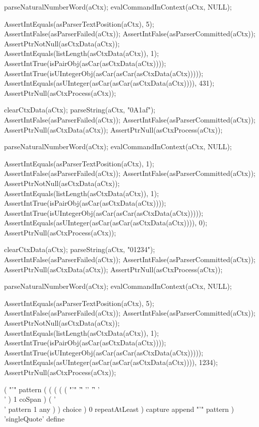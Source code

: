   parseNaturalNumberWord(aCtx);
  evalCommandInContext(aCtx, NULL);
  
  AssertIntEquals(asParserTextPosition(aCtx), 5);
  AssertIntFalse(asParserFailed(aCtx));
  AssertIntFalse(asParserCommitted(aCtx));
  AssertPtrNotNull(asCtxData(aCtx));
  AssertIntEquals(listLength(asCtxData(aCtx)), 1);
  AssertIntTrue(isPairObj(asCar(asCtxData(aCtx))));
  AssertIntTrue(isUIntegerObj(asCar(asCar(asCtxData(aCtx)))));
  AssertIntEquals(asUInteger(asCar(asCar(asCtxData(aCtx)))), 431);  
  AssertPtrNull(asCtxProcess(aCtx));
  
  clearCtxData(aCtx);
  parseString(aCtx, "0A1af");
  AssertIntFalse(asParserFailed(aCtx));
  AssertIntFalse(asParserCommitted(aCtx));
  AssertPtrNull(asCtxData(aCtx));
  AssertPtrNull(asCtxProcess(aCtx));
  
  parseNaturalNumberWord(aCtx);
  evalCommandInContext(aCtx, NULL);
  
  AssertIntEquals(asParserTextPosition(aCtx), 1);
  AssertIntFalse(asParserFailed(aCtx));
  AssertIntFalse(asParserCommitted(aCtx));
  AssertPtrNotNull(asCtxData(aCtx));
  AssertIntEquals(listLength(asCtxData(aCtx)), 1);
  AssertIntTrue(isPairObj(asCar(asCtxData(aCtx))));
  AssertIntTrue(isUIntegerObj(asCar(asCar(asCtxData(aCtx)))));
  AssertIntEquals(asUInteger(asCar(asCar(asCtxData(aCtx)))), 0);
  AssertPtrNull(asCtxProcess(aCtx));
  
  clearCtxData(aCtx);
  parseString(aCtx, "01234");
  AssertIntFalse(asParserFailed(aCtx));
  AssertIntFalse(asParserCommitted(aCtx));
  AssertPtrNull(asCtxData(aCtx));
  AssertPtrNull(asCtxProcess(aCtx));
  
  parseNaturalNumberWord(aCtx);
  evalCommandInContext(aCtx, NULL);
  
  AssertIntEquals(asParserTextPosition(aCtx), 5);
  AssertIntFalse(asParserFailed(aCtx));
  AssertIntFalse(asParserCommitted(aCtx));
  AssertPtrNotNull(asCtxData(aCtx));
  AssertIntEquals(listLength(asCtxData(aCtx)), 1);
  AssertIntTrue(isPairObj(asCar(asCtxData(aCtx))));
  AssertIntTrue(isUIntegerObj(asCar(asCar(asCtxData(aCtx)))));
  AssertIntEquals(asUInteger(asCar(asCar(asCtxData(aCtx)))), 1234);  
  AssertPtrNull(asCtxProcess(aCtx));
\stopCTest
\stopTestCase
\stopTestSuite

\startTestSuite[parseSingleQuoteWord]

\starttyping
(
  "'" pattern
  (
    ( 
      (
        ( ( "'" '\r' '\n' '\f' '\\' ) 1 coSpan )
        ( '\\' pattern 1 any )
      ) choice
    ) 0 repeatAtLeast
  ) capture append
  "'" pattern
) 'singleQuote' define
\stoptyping

